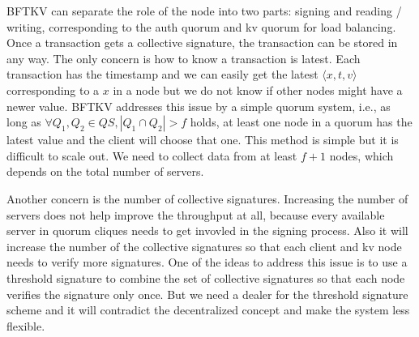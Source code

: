 BFTKV can separate the role of the node into two parts: signing and
reading / writing, corresponding to the auth quorum and kv quorum for
load balancing.
Once a transaction gets a collective signature, the transaction
can be stored in any way. The only concern is how to know a
transaction is latest. Each transaction has the timestamp and we can
easily get the latest $\langle x, t, v \rangle$ corresponding to a $x$
in a node but we do not know if other nodes might have a newer
value. BFTKV addresses this issue by a simple quorum system, i.e., as
long as $\forall Q_1, Q_2 \in QS, |Q_1 \cap Q_2| > f$ holds, at least
one node in a quorum has the latest value and the client will choose
that one. This method is simple but it is difficult to scale out. We
need to collect data from at least $f+1$ nodes, which depends on the
total number of servers.

Another concern is the number of collective signatures. Increasing the
number of servers does not help improve the throughput at all, because
every available server in quorum cliques needs to get invovled in
the signing process. Also it will increase the number of the
collective signatures so that each client and kv node needs to verify
more signatures.
One of the ideas to address this issue is to use a threshold signature
to combine the set of collective signatures so that each node verifies
the signature only once. But we need a dealer for the threshold
signature scheme and it will contradict the decentralized concept and
make the system less flexible.
\fi
